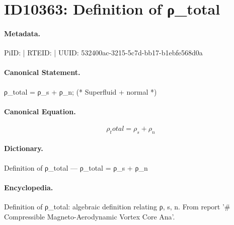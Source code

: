 \section*{ID10363: Definition of ρ\_total}
\paragraph{Metadata.}
PiID:  | RTEID:  | UUID: 532400ac-3215-5c7d-bb17-b1ebfe568d0a

\paragraph{Canonical Statement.}
ρ\_total = ρ\_s + ρ\_n; (* Superfluid + normal *)

\paragraph{Canonical Equation.}
\[
ρ_total = ρ_s + ρ_n
\]

\paragraph{Dictionary.}
Definition of ρ\_total — ρ\_total = ρ\_s + ρ\_n

\paragraph{Encyclopedia.}
Definition of ρ\_total: algebraic definition relating ρ, s, n. From report '\# Compressible Magneto-Aerodynamic Vortex Core Ana'.
